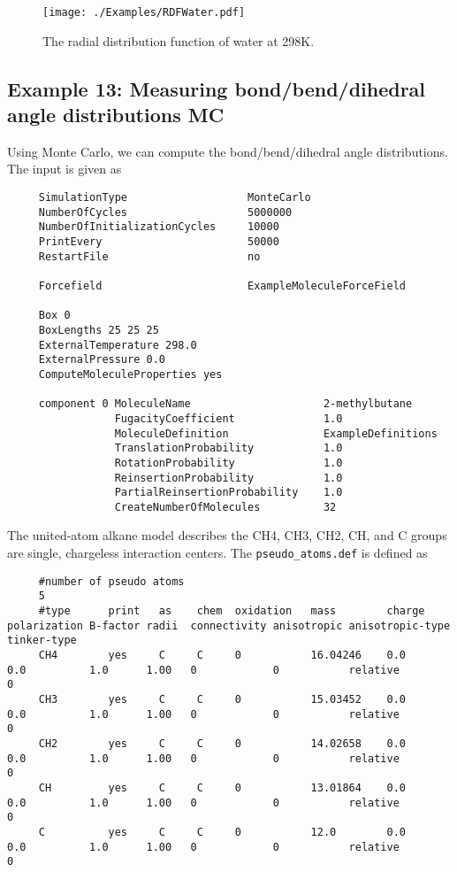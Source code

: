\begin{figure}[H]
  \centering
  \texttt{[image: ./Examples/RDFWater.pdf]}
  \caption{The radial distribution function of water at 298K.}
  \label{Fig: RDF water}
\end{figure}


\subsection*{Example 13: Measuring bond/bend/dihedral angle distributions MC}

Using Monte Carlo, we can compute the bond/bend/dihedral angle distributions.
The input is given as
\begin{tiny}
\begin{verbatim}
     SimulationType                   MonteCarlo
     NumberOfCycles                   5000000
     NumberOfInitializationCycles     10000
     PrintEvery                       50000
     RestartFile                      no

     Forcefield                       ExampleMoleculeForceField

     Box 0
     BoxLengths 25 25 25
     ExternalTemperature 298.0
     ExternalPressure 0.0
     ComputeMoleculeProperties yes

     component 0 MoleculeName                     2-methylbutane
                 FugacityCoefficient              1.0
                 MoleculeDefinition               ExampleDefinitions
                 TranslationProbability           1.0
                 RotationProbability              1.0
                 ReinsertionProbability           1.0
                 PartialReinsertionProbability    1.0
                 CreateNumberOfMolecules          32
\end{verbatim}
\end{tiny}
The united-atom alkane model describes the CH4, CH3, CH2, CH, and C groups are single, chargeless interaction centers.
The \verb+pseudo_atoms.def+ is defined as
\begin{tiny}
\begin{verbatim}
     #number of pseudo atoms
     5
     #type      print   as    chem  oxidation   mass        charge   polarization B-factor radii  connectivity anisotropic anisotropic-type   tinker-type
     CH4        yes     C     C     0           16.04246    0.0      0.0          1.0      1.00   0            0           relative           0
     CH3        yes     C     C     0           15.03452    0.0      0.0          1.0      1.00   0            0           relative           0
     CH2        yes     C     C     0           14.02658    0.0      0.0          1.0      1.00   0            0           relative           0
     CH         yes     C     C     0           13.01864    0.0      0.0          1.0      1.00   0            0           relative           0
     C          yes     C     C     0           12.0        0.0      0.0          1.0      1.00   0            0           relative           0
\end{verbatim}
\end{tiny}

